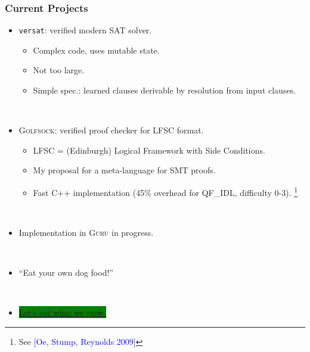 \documentclass[10pt]{beamer}
\begin{document}
\begin{frame}
\frametitle{Current Projects}

\begin{itemize}
\item \texttt{versat}: verified modern SAT solver.
\begin{itemize}
\item Complex code, uses mutable state.
\item Not too large.
\item Simple spec.: learned clauses derivable by resolution from input clauses.
\end{itemize}

\ 

\item \textsc{Golfsock}: verified proof checker for LFSC format.
\begin{itemize}
\item LFSC = (Edinburgh) Logical Framework with Side Conditions.
\item My proposal for a meta-language for SMT proofs.
\item Fast C++ implementation (45\% overhead for QF\_IDL, difficulty 0-3). \footnote{See \textcolor{blue}{[Oe, Stump, Reynolds 2009]}}
\end{itemize}

\ 

\item Implementation in \textsc{Guru} in progress.

\pause

\  

\item ``Eat your own dog food!''

\pause

\ 

\item \colorbox{green}{\underline{Let's eat what we grow.}}

\end{itemize}
\end{frame}
\end{document}
